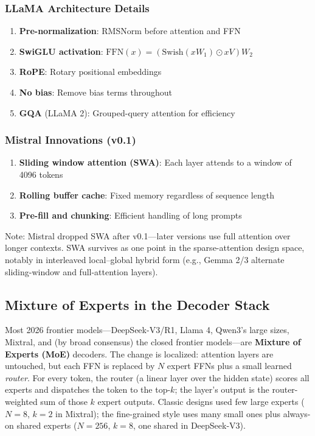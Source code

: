 \subsubsection{LLaMA Architecture Details}

\begin{enumerate}
    \item \textbf{Pre-normalization}: RMSNorm before attention and FFN
    \item \textbf{SwiGLU activation}: $\text{FFN}(x) = (\text{Swish}(xW_1) \odot xV)W_2$
    \item \textbf{RoPE}: Rotary positional embeddings
    \item \textbf{No bias}: Remove bias terms throughout
    \item \textbf{GQA} (LLaMA 2): Grouped-query attention for efficiency
\end{enumerate}

\subsubsection{Mistral Innovations (v0.1)}

\begin{enumerate}
    \item \textbf{Sliding window attention (SWA)}: Each layer attends to a window of 4096 tokens
    \item \textbf{Rolling buffer cache}: Fixed memory regardless of sequence length
    \item \textbf{Pre-fill and chunking}: Efficient handling of long prompts
\end{enumerate}

Note: Mistral dropped SWA after v0.1---later versions use full attention over longer contexts. SWA survives as one point in the sparse-attention design space, notably in interleaved local--global hybrid form (e.g., Gemma 2/3 alternate sliding-window and full-attention layers).

\subsection{Mixture of Experts in the Decoder Stack}
\label{subsec:moe_decoder}

Most 2026 frontier models---DeepSeek-V3/R1, Llama 4, Qwen3's large sizes, Mixtral, and (by broad consensus) the closed frontier models---are \textbf{Mixture of Experts (MoE)} decoders. The change is localized: attention layers are untouched, but each FFN is replaced by $N$ expert FFNs plus a small learned \textit{router}. For every token, the router (a linear layer over the hidden state) scores all experts and dispatches the token to the top-$k$; the layer's output is the router-weighted sum of those $k$ expert outputs. Classic designs used few large experts ($N{=}8$, $k{=}2$ in Mixtral); the fine-grained style uses many small ones plus always-on shared experts ($N{=}256$, $k{=}8$, one shared in DeepSeek-V3).

